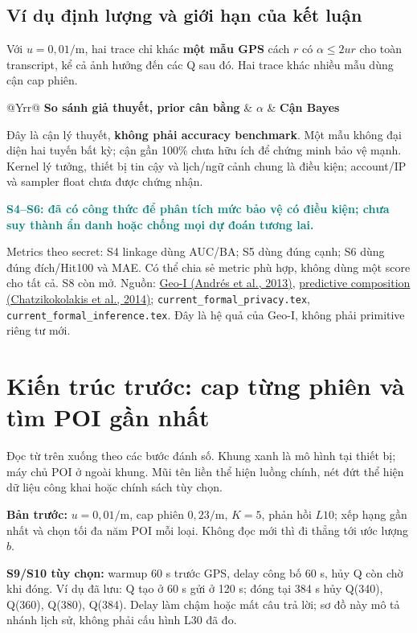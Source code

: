 \documentclass[10pt,a4paper]{article}
\newcommand{\key}[1]{\par\smallskip\noindent\textcolor{teal}{\textbf{#1}}\par\smallskip}
\begin{document}
\subsection{Ví dụ định lượng và giới hạn của kết luận}
Với $u=0{,}01/\mathrm m$, hai trace chỉ khác \textbf{một mẫu GPS} cách $r$ có $\alpha\leq2ur$
cho toàn transcript, kể cả ảnh hưởng đến các Q sau đó. Hai trace khác nhiều mẫu dùng cận cap phiên.
\par\smallskip
\begin{tabularx}{\linewidth}{@{}Yrr@{}}\toprule
\textbf{So sánh giả thuyết, prior cân bằng} & \textbf{$\alpha$} & \textbf{Cận Bayes}\\\midrule
\InferenceRows
\bottomrule\end{tabularx}
Đây là cận lý thuyết, \textbf{không phải accuracy benchmark}. Một mẫu không đại diện hai tuyến bất kỳ;
cận gần 100\% chưa hữu ích để chứng minh bảo vệ mạnh.
Kernel lý tưởng, thiết bị tin cậy và lịch/ngữ cảnh chung là điều kiện; account/IP và sampler float chưa được chứng nhận.

\key{S4--S6: đã có công thức để phân tích mức bảo vệ có điều kiện; chưa suy thành ẩn danh hoặc chống mọi dự đoán tương lai.}
Metrics theo secret: S4 linkage dùng AUC/BA; S5 dùng đúng cạnh; S6 dùng đúng đích/Hit100 và MAE.
Có thể chia sẻ metric phù hợp, không dùng một score cho tất cả. S8 còn mở.
{\footnotesize\color{gray}Nguồn: \href{https://arxiv.org/html/1212.1984v3}{Geo-I (Andrés et al., 2013)},
\href{https://arxiv.org/html/1311.4008v2}{predictive composition (Chatzikokolakis et al., 2014)};
\texttt{current\_formal\_privacy.tex}, \texttt{current\_formal\_inference.tex}. Đây là hệ quả của Geo-I, không phải primitive riêng tư mới.}

\endgroup
\clearpage
\section{Kiến trúc trước: cap từng phiên và tìm POI gần nhất}
Đọc từ trên xuống theo các bước đánh số. Khung xanh là mô hình tại thiết bị; máy chủ POI ở ngoài khung.
Mũi tên liền thể hiện luồng chính, nét đứt thể hiện dữ liệu công khai hoặc chính sách tùy chọn.
\begin{center}\end{center}
\textbf{Bản trước:} $u=0{,}01/\mathrm m$, cap phiên $0{,}23/\mathrm m$, $K=5$, phản hồi $L10$;
xếp hạng gần nhất và chọn tối đa năm POI mỗi loại. Không đọc mới thì đi thẳng tới ước lượng $b$.

\textbf{S9/S10 tùy chọn:} warmup 60 s trước GPS, delay công bố 60 s, hủy Q còn chờ khi đóng.
Ví dụ đã lưu: Q tạo ở 60 s gửi ở 120 s; đóng tại 384 s hủy Q(340), Q(360), Q(380), Q(384).
Delay làm chậm hoặc mất câu trả lời; sơ đồ này mô tả nhánh lịch sử, không phải cấu hình L30 đã đo.
\end{document}
